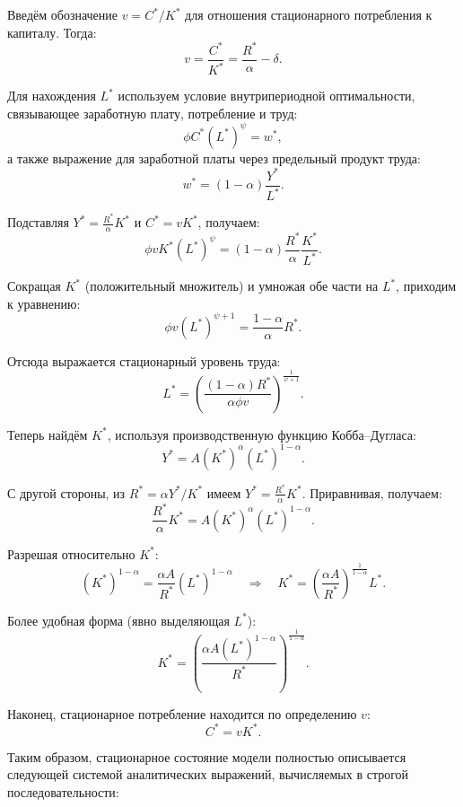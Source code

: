   Введём обозначение $v = C^*/K^*$ для отношения стационарного потребления к капиталу. Тогда:
  \begin{equation}
  v = \frac{C^*}{K^*} = \frac{R^*}{\alpha} - \delta. \tag{3.2}
  \end{equation}


  Для нахождения $L^*$ используем условие внутрипериодной оптимальности, связывающее заработную плату, потребление и труд:
  \[
  \phi C^* (L^*)^{\psi} = w^*,
  \]
  а также выражение для заработной платы через предельный продукт труда:
  \[
  w^* = (1-\alpha)\frac{Y^*}{L^*}.
  \]

  Подставляя $Y^* = \frac{R^*}{\alpha}K^*$ и $C^* = v K^*$, получаем:
  \[
  \phi v K^* (L^*)^{\psi} = (1-\alpha)\frac{R^*}{\alpha}\frac{K^*}{L^*}.
  \]

  Сокращая $K^*$ (положительный множитель) и умножая обе части на $L^*$, приходим к уравнению:
  \[
  \phi v (L^*)^{\psi+1} = \frac{1-\alpha}{\alpha}R^*.
  \]

  Отсюда выражается стационарный уровень труда:
  \begin{equation}
  L^* = \left( \frac{(1-\alpha)R^*}{\alpha \phi v} \right)^{\frac{1}{\psi+1}}. \tag{3.3}
  \end{equation}


  Теперь найдём $K^*$, используя производственную функцию Кобба–Дугласа:
  \[
  Y^* = A (K^*)^{\alpha} (L^*)^{1-\alpha}.
  \]

  С другой стороны, из $R^* = \alpha Y^*/K^*$ имеем $Y^* = \frac{R^*}{\alpha}K^*$. Приравнивая, получаем:
  \[
  \frac{R^*}{\alpha}K^* = A (K^*)^{\alpha} (L^*)^{1-\alpha}.
  \]

  Разрешая относительно $K^*$:
  \[
  (K^*)^{1-\alpha} = \frac{\alpha A}{R^*} (L^*)^{1-\alpha}
  \quad\Longrightarrow\quad
  K^* = \left( \frac{\alpha A}{R^*} \right)^{\frac{1}{1-\alpha}} L^*.
  \]

  Более удобная форма (явно выделяющая $L^*$):
  \begin{equation}
  K^* = \left( \frac{\alpha A (L^*)^{1-\alpha}}{R^*} \right)^{\frac{1}{1-\alpha}}. \tag{3.4}
  \end{equation}

  Наконец, стационарное потребление находится по определению $v$:
  \begin{equation}
  C^* = v K^*. \tag{3.5}
  \end{equation}


  Таким образом, стационарное состояние модели полностью описывается следующей системой аналитических выражений, вычисляемых в строгой последовательности:

